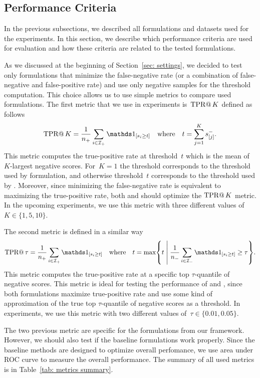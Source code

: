 \subsection{Performance Criteria}\label{sec: performance criteria}

In the previous subsections, we described all formulations and datasets used for the experiments. In this section, we describe which performance criteria are used for evaluation and how these criteria are related to the tested formulations.

As we discussed at the beginning of Section~\ref{sec: settings}, we decided to test only formulations that minimize the false-negative rate (or a combination of false-negative and false-positive rate) and use only negative samples for the threshold computation. This choice allows us to use simple metrics to compare used formulations. The first metric that we use in experiments is~$\operatorname{TPR@}K$ defined as follows
\begin{equation*}
  \tpratk = \frac{1}{\npos} \sum_{i \in \Ipos} \Iverson{s_i \geq t} \quad \text{where} \quad t = \sum_{j = 1}^{K} s^{-}_{[j]}.
\end{equation*}
This metric computes the true-positive rate at threshold~$t$ which is the mean of $K$-largest negative scores. For~$K = 1$ the threshold corresponds to the threshold used by \TopPush formulation, and otherwise threshold~$t$ corresponds to the threshold used by \TopPushK. Moreover, since minimizing the false-negative rate is equivalent to maximizing the true-positive rate, both \TopPush and \TopPushK should optimize the $\operatorname{TPR@}K$ metric. In the upcoming experiments, we use this metric with three different values of~$K \in \{1, 5, 10\}.$

The second metric is defined in a similar way
\begin{equation*}
  \tpratfpr = \frac{1}{\npos} \sum_{i \in \Ipos} \Iverson{s_i \geq t} \quad \text{where} \quad t
  = \max \Set{t}{\frac{1}{\nneg} \sum_{i \in \Ineg} \Iverson{s_i \geq t} \geq \tau}.
\end{equation*}
This metric computes the true-positive rate at a specific top $\tau$-quantile of negative scores. This metric is ideal for testing the performance of \tauFPL and \PatMatNP, since both formulations maximize true-positive rate and use some kind of approximation of the true top $\tau$-quantile of negative scores as a threshold. In experiments, we use this metric with two different values of~$\tau \in \{0.01, 0.05\}.$ 

The two previous metric are specific for the formulations from our framework. However, we should also test if the baseline formulations work properly. Since the baseline methods are designed to optimize overall perfomance, we use area under ROC curve to measure the overall performance. The summary of all used metrics is in Table~\ref{tab: metrics summary}.

